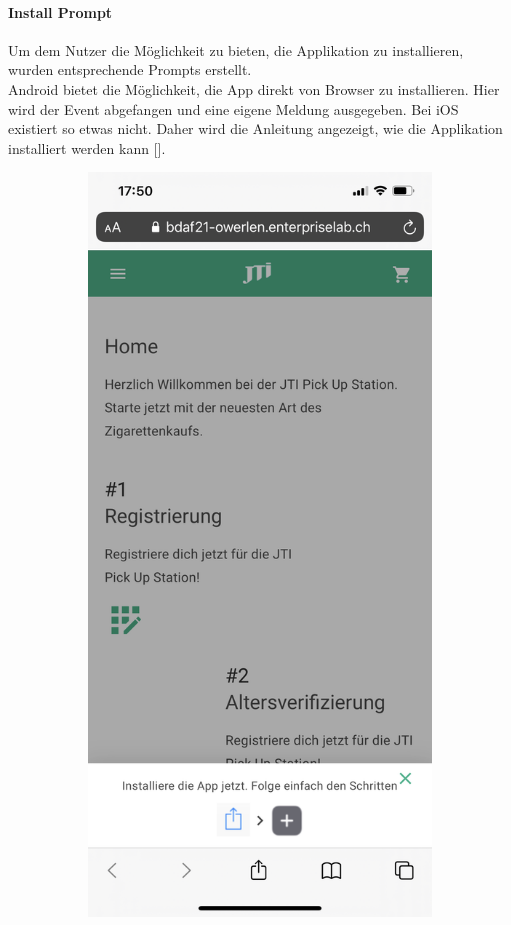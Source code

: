 \paragraph{Install Prompt}
Um dem Nutzer die Möglichkeit zu bieten, die Applikation zu installieren, wurden entsprechende Prompts erstellt.\\
Android bietet die Möglichkeit, die App direkt von Browser zu installieren. Hier wird der Event abgefangen und eine eigene Meldung ausgegeben. Bei iOS existiert so etwas nicht. Daher wird die Anleitung angezeigt, wie die Applikation installiert werden kann [\cite{install}].
\begin{figure}[H]
	\begin{subfigure}[b]{0.5\textwidth}
		\includegraphics[scale=0.12]{images/promptIOS.jpeg}

\end{subfigure}
\end{figure}
